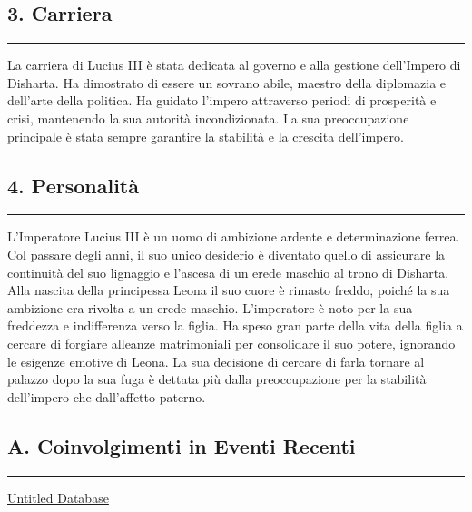 \subsection{3. Carriera}\label{carriera}

\begin{center}\rule{0.5\linewidth}{0.5pt}\end{center}

La carriera di Lucius III è stata dedicata al governo e alla gestione
dell'Impero di Disharta. Ha dimostrato di essere un sovrano abile,
maestro della diplomazia e dell'arte della politica. Ha guidato l'impero
attraverso periodi di prosperità e crisi, mantenendo la sua autorità
incondizionata. La sua preoccupazione principale è stata sempre
garantire la stabilità e la crescita dell'impero.

\subsection{4. Personalità}\label{personalituxe0}

\begin{center}\rule{0.5\linewidth}{0.5pt}\end{center}

L'Imperatore Lucius III è un uomo di ambizione ardente e determinazione
ferrea. Col passare degli anni, il suo unico desiderio è diventato
quello di assicurare la continuità del suo lignaggio e l'ascesa di un
erede maschio al trono di Disharta. Alla nascita della principessa Leona
il suo cuore è rimasto freddo, poiché la sua ambizione era rivolta a un
erede maschio. L'imperatore è noto per la sua freddezza e indifferenza
verso la figlia. Ha speso gran parte della vita della figlia a cercare
di forgiare alleanze matrimoniali per consolidare il suo potere,
ignorando le esigenze emotive di Leona. La sua decisione di cercare di
farla tornare al palazzo dopo la sua fuga è dettata più dalla
preoccupazione per la stabilità dell'impero che dall'affetto paterno.

\subsection{A. Coinvolgimenti in Eventi
Recenti}\label{a.-coinvolgimenti-in-eventi-recenti}

\begin{center}\rule{0.5\linewidth}{0.5pt}\end{center}

\href{Untitled\%20Database\%20665a498987254279b64261b8cc19c10e.csv}{Untitled
Database}
